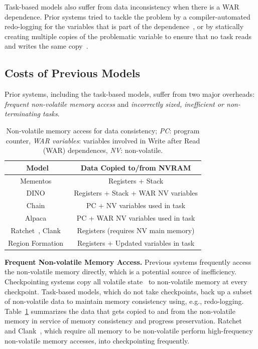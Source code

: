 Task-based models also suffer from data inconsistency when there is a WAR
dependence.  Prior systems tried to tackle the problem by a compiler-automated
redo-logging for the variables that is part of the dependence~\cite{alpaca}, or
by statically creating multiple copies of the problematic variable to ensure
that no task reads and writes the same copy~\cite{chain}.

\subsection{Costs of Previous Models}
\label{sec:cost_task-based}

Prior systems, including the task-based models, suffer from two major overheads:
{\em frequent non-volatile memory access} and {\em incorrectly sized, inefficient or non-terminating tasks}.

\begin{table}
	\centering
	\footnotesize
	\begin{tabular}{|c|c|}
		\hline
		Model & Data Copied to/from NVRAM \\
		\hline\hline
		Mementos~\cite{mementos}	& Registers + Stack     \\
		DINO~\cite{dino}	& Registers + Stack + WAR NV variables \\%
		Chain~\cite{chain}	& PC + NV variables used in task\\
		Alpaca~\cite{alpaca}	& PC + WAR NV variables used in task\\
		Ratchet~\cite{ratchet}, Clank~\cite{hicks_isca_2017} & Registers (requires NV main memory) \\
		Region Formation~\cite{baghsorkhi_cgo_2018} & Registers + Updated variables in task \\
		\hline
	\end{tabular}
	\caption{Non-volatile memory access for data consistency; \emph{PC}: program counter, \emph{WAR variables}: variables involved in Write after Read (WAR) dependences, \emph{NV}: non-volatile.}
	\label{table:chechpoint_comparison}
\end{table}


\textbf{Frequent Non-volatile Memory Access.} 
Previous systems frequently access the non-volatile memory directly, which is a potential source of inefficiency.  Checkpointing systems copy all volatile
state~\cite{dino, mementos, ratchet, hicks_isca_2017} to non-volatile memory at
every checkpoint.  Task-based models, which do not take checkpoints, back up a
subset of non-volatile data to maintain memory consistency using, e.g.,
redo-logging.  Table~\ref{table:chechpoint_comparison} summarizes the data that
gets copied to and from the non-volatile memory in service of memory
consistency and progress preservation.  Ratchet~\cite{ratchet} and
Clank~\cite{hicks_isca_2017}, which require all memory to be non-volatile
perform high-frequency non-volatile memory accesses, into checkpointing
frequently.

